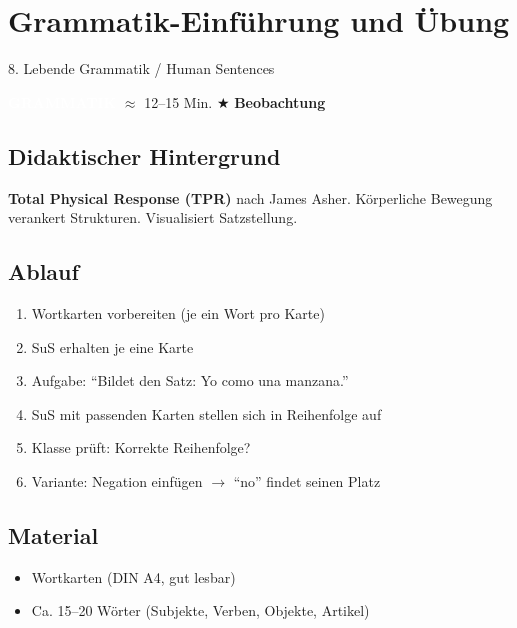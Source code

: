 \documentclass[11pt, a4paper]{article}
\newcommand{\tagGrammatik}{\colorbox{grammatik}{\textcolor{white}{\footnotesize\textbf{GRAMMATIK}}}}
\newcommand{\zeit}[1]{\textcolor{grau}{\footnotesize $\approx$ #1 Min.}}
\newcommand{\beobachtung}{\textcolor{erfolg}{\footnotesize $\bigstar$ \textbf{Beobachtung}}}
\begin{document}
\newpage


\section{Grammatik-Einführung und Übung}

\begin{methode}{8. Lebende Grammatik / Human Sentences}

\tagGrammatik{} \zeit{12--15} \hfill \beobachtung

\subsection*{Didaktischer Hintergrund}
\textbf{Total Physical Response (TPR)} nach James Asher. Körperliche Bewegung verankert Strukturen. Visualisiert Satzstellung.

\subsection*{Ablauf}
\begin{enumerate}[leftmargin=*]
    \item Wortkarten vorbereiten (je ein Wort pro Karte)
    \item SuS erhalten je eine Karte
    \item Aufgabe: ``Bildet den Satz: Yo como una manzana.''
    \item SuS mit passenden Karten stellen sich in Reihenfolge auf
    \item Klasse prüft: Korrekte Reihenfolge?
    \item Variante: Negation einfügen $\rightarrow$ ``no'' findet seinen Platz
\end{enumerate}

\subsection*{Material}
\begin{materialbox}
\begin{itemize}[label=$\square$, leftmargin=*]
    \item Wortkarten (DIN A4, gut lesbar)
    \item Ca. 15--20 Wörter (Subjekte, Verben, Objekte, Artikel)
\end{itemize}


\end{materialbox}
\end{methode}
\end{document}
